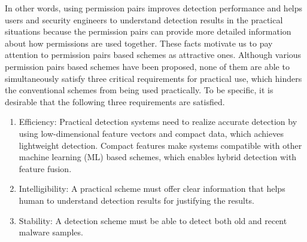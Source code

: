 \documentclass{ieeeaccess}
\begin{document}
In other words, using permission pairs improves detection performance and helps users and security engineers to understand detection results in the practical situations because the permission pairs can provide more detailed information about how permissions are used together.
These facts motivate us to pay attention to permission pairs based schemes \cite{liang2014permission, liu2014two, arora2019permpair} as attractive ones.  
Although various permission pairs based schemes \cite{liang2014permission, liu2014two, arora2019permpair} have been proposed, none of them are able to simultaneously satisfy three critical requirements for practical use, which hinders the conventional schemes from being used practically.
To be specific, it is desirable that the following three requirements are satisfied.
\begin{enumerate}
  \item Efficiency: Practical detection systems need to realize accurate detection by using low-dimensional feature vectors and compact data, which achieves lightweight detection.  
    Compact features make systems compatible with other machine learning (ML) based schemes, which enables hybrid detection with feature fusion.
  \item Intelligibility: A practical scheme must offer clear information that helps human to understand detection results for justifying the results.
  \item Stability: A detection scheme must be able to detect both old and recent malware samples.
\end{enumerate}
\end{document}
